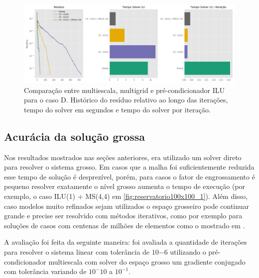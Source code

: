     
\begin{figure}[!htbp]
\label{fig:casoE_2}
\centering
\includegraphics[width=\textwidth]{chap08/figs/casoE_2.png}
\caption{Comparação entre multiescala, multigrid e pré-condicionador ILU para o caso D. Histórico do resíduo relativo ao longo das iterações, tempo do solver em segundos e tempo do solver por iteração. }
\end{figure}


\subsection{Acurácia da solução grossa}

Nos resultados mostrados nas seções anteriores, era utilizado um solver direto para resolver 
o sistema grosso. Em casos que a malha foi suficientemente reduzida esse tempo de solução é desprezível,
porém, para casos o fator de engrossamento é pequeno resolver exatamente o nível grosso aumenta
o tempo de execução (por exemplo, o caso ILU(1) + MS(4,4) em \ref{fig:reservatorio100x100_1}). 
Além disso, caso modelos muito refinados sejam utilizados o espaço grosseiro pode continuar
grande e precise ser resolvido com métodos iterativos, como por exemplo para soluções de casos
com centenas de milhões de elementos como o mostrado em \cite{geomecrio}.


A avaliação foi feita da seguinte maneira: foi avaliada a quantidade de iterações para resolver o sistema linear com tolerância de $10{-6}$ utilizando o pré-condicionador multiescala com solver do espaço grosso um gradiente conjugado com tolerância variando de $10^-10$  a $10^{-1}$. 